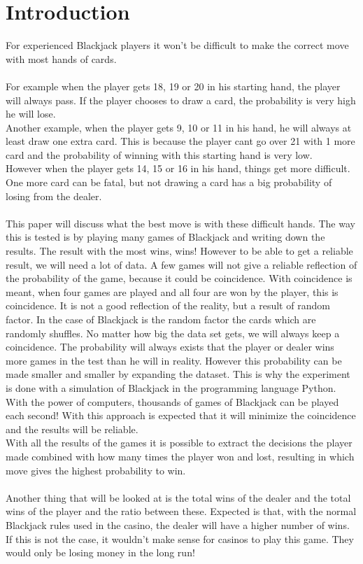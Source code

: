 \section{Introduction}
For experienced Blackjack players it won't be difficult to make the correct move with most hands of cards. \\
 \\
For example when the player gets 18, 19 or 20 in his starting hand, the player will always pass. If the player chooses to draw a card, the probability is very high he will lose. \\
Another example, when the player gets 9, 10 or 11 in his hand, he will always at least draw one extra card. This is because the player can\textquotesingle t go over 21 with 1 more card and the probability of winning with this starting hand is very low. \\
However when the player gets 14, 15 or 16 in his hand, things get more difficult. One more card can be fatal, but not drawing a card has a big probability of losing from the dealer. \\
 \\
This paper will discuss what the best move is with these difficult hands. The way this is tested is by playing many games of Blackjack and writing down the results. The result with the most wins, wins! However to be able to get a reliable result, we will need a lot of data. A few games will not give a reliable reflection of the probability of the game, because it could be coincidence. With coincidence is meant, when four games are played and all four are won by the player, this is coincidence. It is not a good reflection of the reality, but a result of random factor. In the case of Blackjack is the random factor the cards which are randomly shuffles. No matter how big the data set gets, we will always keep a coincidence. The probability will always exists that the player or dealer wins more games in the test than he will in reality. However this probability can be made smaller and smaller by expanding the dataset. This is why the experiment is done with a simulation of Blackjack in the programming language Python. With the power of computers, thousands of games of Blackjack can be played each second! With this approach is expected that it will minimize the coincidence and the results will be reliable. \\
With all the results of the games it is possible to extract the decisions the player made combined with how many times the player won and lost, resulting in which move gives the highest probability to win. \\
 \\
Another thing that will be looked at is the total wins of the dealer and the total wins of the player and the ratio between these. Expected is that, with the normal Blackjack rules used in the casino, the dealer will have a higher number of wins. If this is not the case, it wouldn't make sense for casinos to play this game. They would only be losing money in the long run! \\